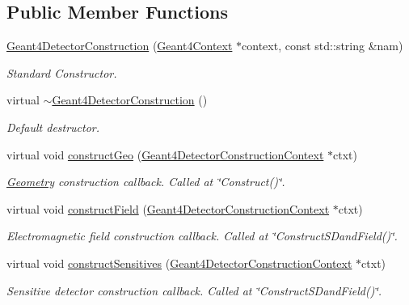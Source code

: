 \subsection*{Public Member Functions}
\begin{DoxyCompactItemize}
\item 
\hyperlink{class_d_d4hep_1_1_simulation_1_1_geant4_detector_construction_a82b863f888681245e472b87ead98c344}{Geant4DetectorConstruction} (\hyperlink{class_d_d4hep_1_1_simulation_1_1_geant4_context}{Geant4Context} $\ast$context, const std::string \&nam)
\begin{DoxyCompactList}\small\item\em Standard Constructor. \item\end{DoxyCompactList}\item 
virtual \hyperlink{class_d_d4hep_1_1_simulation_1_1_geant4_detector_construction_a78fcc174794d8ef64b402c1c296c43db}{$\sim$Geant4DetectorConstruction} ()
\begin{DoxyCompactList}\small\item\em Default destructor. \item\end{DoxyCompactList}\item 
virtual void \hyperlink{class_d_d4hep_1_1_simulation_1_1_geant4_detector_construction_a91ab552e6ee76df9e0ebff3351863ebd}{constructGeo} (\hyperlink{class_d_d4hep_1_1_simulation_1_1_geant4_detector_construction_context}{Geant4DetectorConstructionContext} $\ast$ctxt)
\begin{DoxyCompactList}\small\item\em \hyperlink{namespace_d_d4hep_1_1_geometry}{Geometry} construction callback. Called at \char`\"{}Construct()\char`\"{}. \item\end{DoxyCompactList}\item 
virtual void \hyperlink{class_d_d4hep_1_1_simulation_1_1_geant4_detector_construction_af7b296f1aa62b4d836c6275108953208}{constructField} (\hyperlink{class_d_d4hep_1_1_simulation_1_1_geant4_detector_construction_context}{Geant4DetectorConstructionContext} $\ast$ctxt)
\begin{DoxyCompactList}\small\item\em Electromagnetic field construction callback. Called at \char`\"{}ConstructSDandField()\char`\"{}. \item\end{DoxyCompactList}\item 
virtual void \hyperlink{class_d_d4hep_1_1_simulation_1_1_geant4_detector_construction_a852a3cd581f106a1f8c65122fb517dab}{constructSensitives} (\hyperlink{class_d_d4hep_1_1_simulation_1_1_geant4_detector_construction_context}{Geant4DetectorConstructionContext} $\ast$ctxt)
\begin{DoxyCompactList}\small\item\em Sensitive detector construction callback. Called at \char`\"{}ConstructSDandField()\char`\"{}. \item\end{DoxyCompactList}\end{DoxyCompactItemize}


